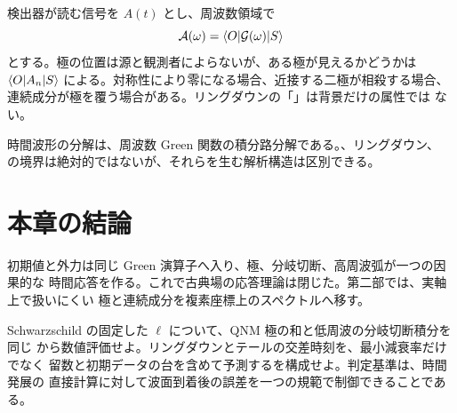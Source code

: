 検出器が読む信号を $A(t)$ とし、周波数領域で
\begin{equation}
\mathcal{A}(\omega)
=
\langle O \rvert\mathcal{G}(\omega)\lvert S \rangle
\label{eq:observable-frequency-response}
\end{equation}
とする。極の位置は源と観測者によらないが、ある極が見えるかどうかは
$\langle O \rvert A_n\lvert S \rangle$ による。対称性により零になる場合、近接する二極が相殺する場合、
連続成分が極を覆う場合がある。リングダウンの「」は背景だけの属性では
ない。

\begin{principlebox}
時間波形の分解は、周波数 Green 関数の積分路分解である。、リングダウン、
の境界は絶対的ではないが、それらを生む解析構造は区別できる。
\end{principlebox}

\section{本章の結論}

初期値と外力は同じ Green 演算子へ入り、極、分岐切断、高周波弧が一つの因果的な
時間応答を作る。これで古典場の応答理論は閉じた。第二部では、実軸上で扱いにくい
極と連続成分を複素座標上のスペクトルへ移す。

\begin{researchproblem}[極とテールの一様近似]
Schwarzschild の固定した $\ell$ について、QNM 極の和と低周波の分岐切断積分を同じ
から数値評価せよ。リングダウンとテールの交差時刻を、最小減衰率だけでなく
留数と初期データの台を含めて予測するを構成せよ。判定基準は、時間発展の
直接計算に対して波面到着後の誤差を一つの規範で制御できることである。
\end{researchproblem}
